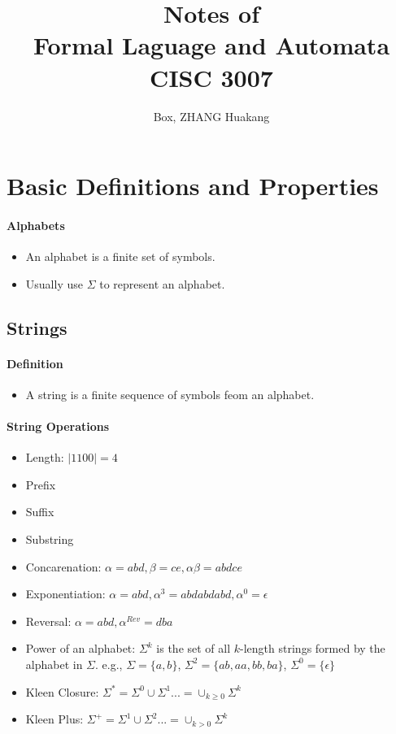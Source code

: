 \documentclass[titlepage]{article}
\title{Notes of\\ Formal Laguage and Automata\\ CISC 3007}
\author{Box, ZHANG Huakang}
\begin{document}
    \maketitle
    \section{Basic Definitions and Properties}
        \paragraph{Alphabets}
        \begin{itemize}
            \item An alphabet is a finite set of symbols. 
            \item Usually use $\Sigma$ to represent an alphabet.
        \end{itemize}
        \subsection*{Strings}
            \paragraph{Definition}
            \begin{itemize}
                \item A string is a finite sequence of symbols feom an alphabet.
            \end{itemize}
            \paragraph{String Operations}
            \begin{itemize}
                \item Length: $|1100|=4$
                \item Prefix
                \item Suffix
                \item Substring
                \item Concarenation: $\alpha=abd,\beta=ce,\alpha\beta=abdce$
                \item Exponentiation: $\alpha=abd, \alpha^3=abdabdabd, \alpha^0=\epsilon$
                \item Reversal: $\alpha=abd, \alpha^{Rev}=dba$
                \item Power of an alphabet: $\Sigma^k$ is the set of all $k$-length strings formed by the alphabet in $\Sigma$. e.g., $\Sigma=\{a,b\}$, $\Sigma^2=\{ab,aa,bb,ba\}$, $\Sigma^0=\{\epsilon\}$
                \item Kleen Closure: $\Sigma^*=\Sigma^0\cup \Sigma^1...=\cup_{k\geq 0}\Sigma^k$
                \item Kleen Plus: $\Sigma^+=\Sigma^1\cup \Sigma^2...=\cup_{k> 0}\Sigma^k$
            \end{itemize}
\end{document}
